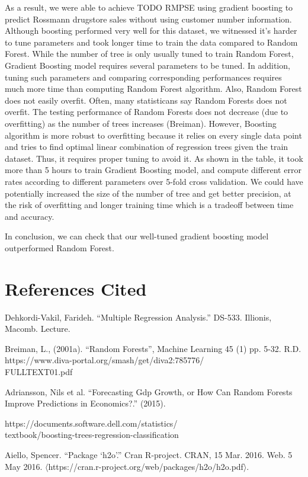 \documentclass[letterpaper,twocolumn,11pt]{article}
\begin{document}
As a result, we were able to achieve TODO RMPSE using gradient boosting to predict Rossmann drugstore sales without using customer number information. Although boosting performed very well for this dataset, we witnessed it's harder to tune parameters and took longer time to train the data compared to Random Forest. While the number of tree is only usually tuned to train Random Forest, Gradient Boosting model requires several parameters to be tuned. In addition, tuning such parameters and comparing corresponding performances requires much more time than computing Random Forest algorithm. Also, Random Forest does not easily overfit. Often, many statisticans say Random Forests does not overfit. The testing performance of Random Forests does not decrease (due to overfitting) as the number of trees increases (Breiman). However, Boosting algorithm is more robust to overfitting because it relies on every single data point and tries to find optimal linear combination of regression trees given the train dataset. Thus, it requires proper tuning to avoid it. As shown in the table, it took more than 5 hours to train Gradient Boosting model, and compute different error rates according to different parameters over 5-fold cross validation. We could have potentially increased the size of the number of tree and get better precision, at the risk of overfitting and longer training time which is a tradeoff between time and accuracy.

In conclusion, we can check that our well-tuned gradient boosting model outperformed Random Forest. 

\section{References Cited}

Dehkordi-Vakil, Farideh. ``Multiple Regression Analysis.'' DS-533. Illionis, Macomb. Lecture.

Breiman, L., (2001a). ``Random Forests'', Machine Learning 45 (1) pp. 5-32.
R.D. https://www.diva-portal.org/smash/get/diva2:785776/\\
FULLTEXT01.pdf

Adriansson, Nils et al. “Forecasting Gdp Growth, or How Can Random Forests Improve Predictions in Economics?.” (2015).

https://documents.software.dell.com/statistics/\\
textbook/boosting-trees-regression-classification

Aiello, Spencer. ``Package ‘h2o'.'' Cran R-project. CRAN, 15 Mar. 2016. Web. 5 May 2016. $\langle$https://cran.r-project.org/web/packages/h2o/h2o.pdf$\rangle$.
\end{document}
